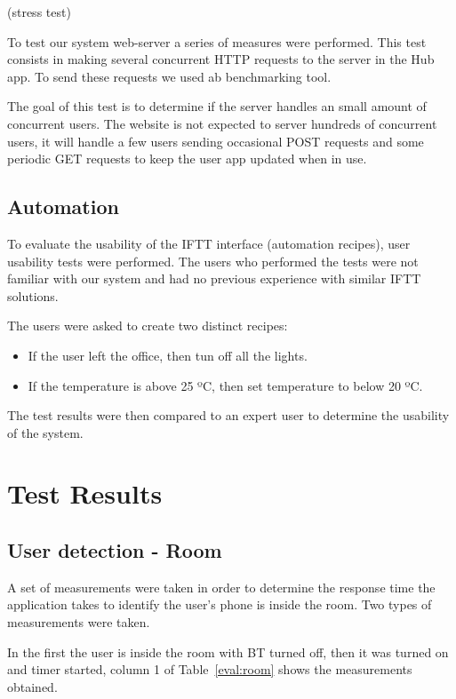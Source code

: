(stress test)

To test our system web-server a series of measures were performed. This test consists in making several concurrent \ac{HTTP} requests to the server in the Hub app. To send these requests we used \ac{ab} benchmarking tool.

The goal of this test is to determine if the server handles an small amount of concurrent users. The website is not expected to server hundreds of concurrent users, it will handle a few users sending occasional POST requests and some periodic GET requests to keep the user app updated when in use.


\subsection{Automation}

To evaluate the usability of the \ac{IFTT} interface (automation recipes), user usability tests were performed. The users who performed the tests were not familiar with our system and had no previous experience with similar \ac{IFTT} solutions.

The users were asked to create two distinct recipes:

\begin{itemize}
  \item If the user left the office, then tun off all the lights.
  \item If the temperature is above 25 ºC, then set temperature to below 20 ºC. 
\end{itemize} 

The test results were then compared to an expert user to determine the usability of the system.



\section{Test Results}


\subsection{User detection - Room}

A set of measurements were taken in order to determine the response time the application takes to identify the user's phone is inside the room. Two types of measurements were taken.

In the first the user is inside the room with \ac{BT} turned off, then it was turned on and timer started, column 1 of Table~\ref{eval:room} shows the measurements obtained. 

